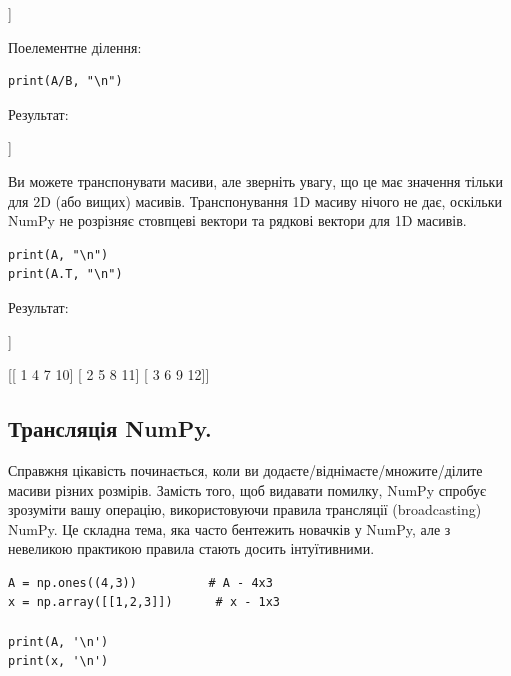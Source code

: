 \begin{console}
[[ 1  2  3]
 [ 4 10  6]
 [21  8 27]
 [10 44 12]] 
\end{console}



Поелементне ділення:

\begin{lstlisting}
print(A/B, "\n")
\end{lstlisting}

Результат:

\begin{console}
[[ 1.          2.          3.        ]
 [ 4.          2.5         6.        ]
 [ 2.33333333  8.          3.        ]
 [10.          2.75       12.        ]] 
\end{console}



Ви можете транспонувати масиви, але зверніть увагу, що це має значення тільки для 2D (або вищих) масивів. Транспонування 1D масиву нічого не дає, оскільки NumPy не розрізняє стовпцеві вектори та рядкові вектори для 1D масивів.

\begin{lstlisting}
print(A, "\n")
print(A.T, "\n")
\end{lstlisting}

Результат:

\begin{console}
[[ 1  2  3]
 [ 4  5  6]
 [ 7  8  9]
 [10 11 12]] 

[[ 1  4  7 10]
 [ 2  5  8 11]
 [ 3  6  9 12]] 
\end{console}




\subsection{Трансляція NumPy.}

Справжня цікавість починається, коли ви додаєте/віднімаєте/множите/ділите масиви різних розмірів. Замість того, щоб видавати помилку, NumPy спробує зрозуміти вашу операцію, використовуючи правила трансляції (broadcasting) NumPy. Це складна тема, яка часто бентежить новачків у NumPy, але з невеликою практикою правила стають досить інтуїтивними.

\begin{lstlisting}
A = np.ones((4,3))          # A - 4x3
x = np.array([[1,2,3]])      # x - 1x3

print(A, '\n')
print(x, '\n')
\end{lstlisting}

